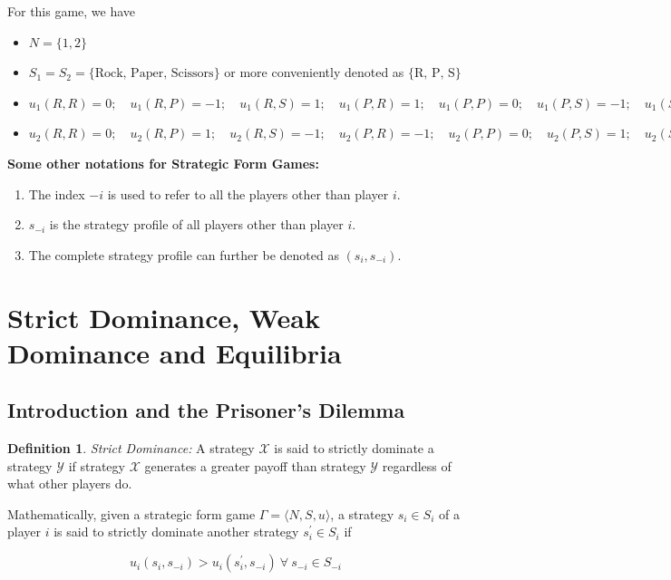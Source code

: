 \documentclass{article}
\theoremstyle{definition}
\newtheorem{defn}[theorem]{Definition}
\begin{document}
For this game, we have 

\begin{itemize}
    \item $N = \{1,2\}$
    \item $S_1 = S_2 = \{\text{Rock, Paper, Scissors} \}$ or more conveniently denoted as $\{ \text{R, P, S}\}$
    \item $u_1(R,R) = 0; \quad u_1(R,P) = -1; \quad u_1(R,S) = 1; \quad u_1(P,R) = 1; \quad u_1(P,P) = 0; \quad u_1(P,S) = -1; \quad u_1(S,R) = -1; \quad u_1(S,P) = 1; \quad u_1(S,S) = 0$
    \item $u_2(R,R) = 0; \quad u_2(R,P) = 1; \quad u_2(R,S) = -1; \quad u_2(P,R) = -1; \quad u_2(P,P) = 0; \quad u_2(P,S) = 1; \quad u_2(S,R) = 1; \quad u_2(S,P) = -1; \quad u_2(S,S) = 0$
\end{itemize}

\textbf{Some other notations for Strategic Form Games:}

\begin{enumerate}
        \item The index $-i$ is used to refer to all the players other than player $i$.
        \item $s_{-i}$ is the strategy profile of all players other than player $i$.
        \item The complete strategy profile can further be denoted as $(s_i, s_{-i})$.
\end{enumerate} 

\section{Strict Dominance, Weak Dominance and Equilibria}

\subsection{Introduction and the Prisoner's Dilemma}

\begin{defn}
\textit{Strict Dominance:} A strategy $\mathcal{X}$ is said to strictly dominate a strategy $\mathcal{Y}$ if strategy $\mathcal{X}$ generates a greater payoff than strategy $\mathcal{Y}$ regardless of what other players do. \medskip

Mathematically, given a strategic form game $\Gamma = \langle N, S, u\rangle$, a strategy $s_i \in S_i$ of a player $i$ is said to strictly dominate another strategy $s^{\prime}_i \in S_i$ if 

\[
    u_i(s_i, s_{-i}) > u_i(s^{\prime}_i, s_{-i}) \: \forall \: s_{-i} \in S_{-i}
\]
\end{defn}
\end{document}
